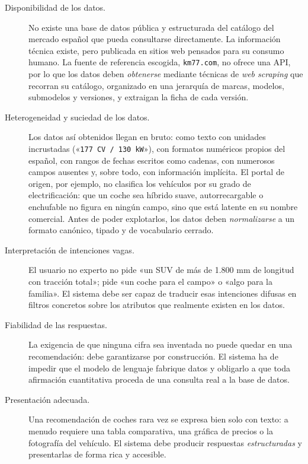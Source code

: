 \begin{description}
  \item[Disponibilidad de los datos.] No existe una base de datos pública y
        estructurada del catálogo del mercado español que pueda consultarse
        directamente. La información técnica existe, pero publicada en sitios web
        pensados para su consumo humano. La fuente de referencia escogida,
        \texttt{km77.com}, no ofrece una API, por lo que los datos deben
        \emph{obtenerse} mediante técnicas de \emph{web scraping} que recorran su
        catálogo, organizado en una jerarquía de marcas, modelos, submodelos y
        versiones, y extraigan la ficha de cada versión.

  \item[Heterogeneidad y suciedad de los datos.] Los datos así obtenidos llegan
        en bruto: como texto con unidades incrustadas («\texttt{177 CV / 130
        kW}»), con formatos numéricos propios del español, con rangos de fechas
        escritos como cadenas, con numerosos campos ausentes y, sobre todo, con
        información implícita. El portal de origen, por ejemplo, no clasifica los
        vehículos por su grado de electrificación: que un coche sea híbrido suave,
        autorrecargable o enchufable no figura en ningún campo, sino que está
        latente en su nombre comercial. Antes de poder explotarlos, los datos
        deben \emph{normalizarse} a un formato canónico, tipado y de vocabulario
        cerrado.

  \item[Interpretación de intenciones vagas.] El usuario no experto no pide «un
        SUV de más de 1.800 mm de longitud con tracción total»; pide «un coche
        para el campo» o «algo para la familia». El sistema debe ser capaz de
        traducir esas intenciones difusas en filtros concretos sobre los atributos
        que realmente existen en los datos.

  \item[Fiabilidad de las respuestas.] La exigencia de que ninguna cifra sea
        inventada no puede quedar en una recomendación: debe garantizarse por
        construcción. El sistema ha de impedir que el modelo de lenguaje fabrique
        datos y obligarlo a que toda afirmación cuantitativa proceda de una
        consulta real a la base de datos.

  \item[Presentación adecuada.] Una recomendación de coches rara vez se expresa
        bien solo con texto: a menudo requiere una tabla comparativa, una gráfica
        de precios o la fotografía del vehículo. El sistema debe producir
        respuestas \emph{estructuradas} y presentarlas de forma rica y accesible.
\end{description}


